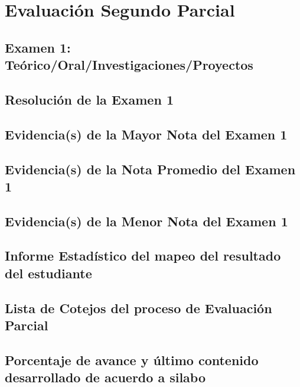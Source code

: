 \chapter{Evaluación Segundo Parcial}
\newpage
% 
% 
% 

\section{Examen 1: Teórico/Oral/Investigaciones/Proyectos}
\section{Resolución de la Examen 1}
\section{Evidencia(s) de la Mayor Nota del Examen 1}
\section{Evidencia(s) de la Nota Promedio del Examen 1}
\section{Evidencia(s) de la Menor Nota del Examen 1}
\section{Informe Estadístico del mapeo del resultado del estudiante}
\section{Lista de Cotejos del proceso de Evaluación Parcial}
\section{Porcentaje de avance y último contenido desarrollado de acuerdo a silabo}

\pagestyle{empty} 



